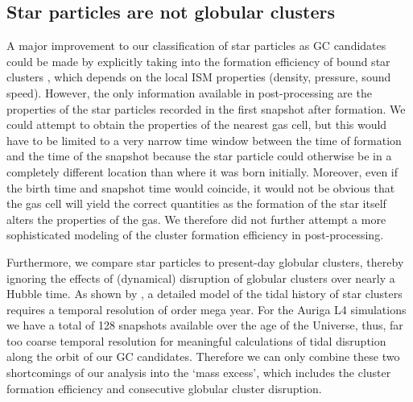 \documentclass[a4paper,fleqn,usenatbib]{mnras}
\begin{document}
\subsection{Star particles are not globular clusters}
\label{sec:discussion_mass_excess}
A major improvement to our classification of star particles as GC candidates
could be made by explicitly taking into the formation efficiency of bound star 
clusters \citep{2012MNRAS.426.3008K}, which depends on the local ISM properties
(density, pressure, sound speed). However, the only information available in 
post-processing are the properties of the star particles recorded in the first 
snapshot after formation. We could attempt to obtain the properties of the nearest
gas cell, but this would have to be limited to a very narrow time window between
the time of formation and the time of the snapshot because the star particle could 
otherwise be in a completely different location than where it was born initially. 
Moreover, even if the birth time and snapshot time would coincide, it would not
be obvious that the gas cell will yield the correct quantities as the formation
of the star itself alters the properties of the gas. We therefore did not further
attempt a more sophisticated modeling of the cluster formation efficiency in
post-processing.

Furthermore, we compare star particles to present-day globular clusters, thereby
ignoring the effects of (dynamical) disruption of globular clusters over nearly
a Hubble time. As shown by \citep{2018MNRAS.475.4309P}, a detailed model of the tidal
history of star clusters requires a temporal resolution of order mega year. For
the Auriga L4 simulations we have a total of 128 snapshots available over the
age of the Universe, thus, far too coarse temporal resolution for meaningful 
calculations of tidal disruption along the orbit of our GC candidates. Therefore 
we can only combine these two shortcomings of our analysis into the `mass excess',
which includes the cluster formation efficiency and consecutive globular cluster 
disruption. 
\end{document}
